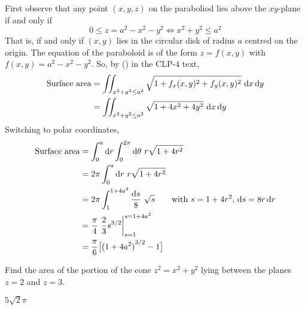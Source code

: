 \begin{solution}
First observe that any point $(x,y,z)$ on the paraboliod lies above the $xy$-plane if and only if
\begin{equation*}
0\le z = a^2-x^2-y^2
\iff x^2+y^2\le a^2
\end{equation*} 
That is, if and only if $(x,y)$ lies in the circular disk of radius $a$
centred on the origin. The equation of the paraboloid is of the form 
$z=f(x,y)$ with $f(x,y)=a^2-x^2-y^2$. So, by 
() in the CLP-4 text,
\begin{align*}
\text{Surface area}
&= \dblInt_{x^2+y^2\le a^2}\sqrt{1+f_x(x,y)^2+f_y(x,y)^2}\ \dee{x}\,\dee{y} \\
&= \dblInt_{x^2+y^2\le a^2}\sqrt{1+4x^2+4y^2}\ \dee{x}\,\dee{y}
\end{align*}
Switching to polar coordinates,
\begin{align*}
\text{Surface area}
&= \int_0^a\mathrm{d}r\int_0^{2\pi}\mathrm{d}\theta\ r\sqrt{1+4r^2}\\
&= 2\pi \int_0^a\mathrm{d}r\ r\sqrt{1+4r^2}\\
&= 2\pi \int_1^{1+4a^2}\frac{\mathrm{d}s}{8}\ \sqrt{s}\qquad
\text{with $s=1+4r^2$, $\mathrm{d}s=8r\,\mathrm{d}r$} \\
&=\frac{\pi}{4}\ \frac{2}{3}s^{3/2}\bigg|_{s=1}^{s=1+4a^2} \\
&=\frac{\pi}{6}\big[{(1+4a^2)}^{3/2}-1\big]
\end{align*}

\end{solution}


\begin{question}[M253 2014D] %
Find the area of the portion of the cone $z^2 = x^2 + y^2$ 
lying between the planes $z = 2$ and $z = 3$.
\end{question}


\begin{answer}
$5\sqrt{2}\pi$
\end{answer}


